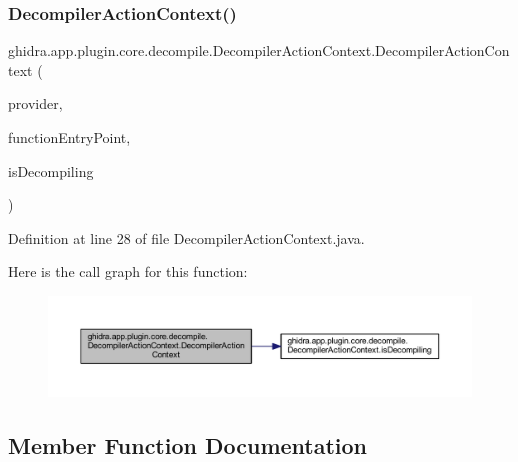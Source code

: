 \subsubsection{\texorpdfstring{DecompilerActionContext()}{DecompilerActionContext()}}
{\footnotesize\ttfamily ghidra.\+app.\+plugin.\+core.\+decompile.\+Decompiler\+Action\+Context.\+Decompiler\+Action\+Context (\begin{DoxyParamCaption}\item[{\mbox{\hyperlink{classghidra_1_1app_1_1plugin_1_1core_1_1decompile_1_1_decompiler_provider}{Decompiler\+Provider}}}]{provider,  }\item[{\mbox{\hyperlink{class_address}{Address}}}]{function\+Entry\+Point,  }\item[{boolean}]{is\+Decompiling }\end{DoxyParamCaption})\hspace{0.3cm}{\ttfamily [inline]}}



Definition at line 28 of file Decompiler\+Action\+Context.\+java.

Here is the call graph for this function\+:
\nopagebreak
\begin{figure}[H]
\begin{center}
\leavevmode
\includegraphics[width=350pt]{classghidra_1_1app_1_1plugin_1_1core_1_1decompile_1_1_decompiler_action_context_ae0dbbac7d212118061ba8598ab5360cc_cgraph}
\end{center}
\end{figure}


\subsection{Member Function Documentation}
\mbox{\label{classghidra_1_1app_1_1plugin_1_1core_1_1decompile_1_1_decompiler_action_context_a9c16b19e93bd3ab22f8231d8efa69e25}} 
